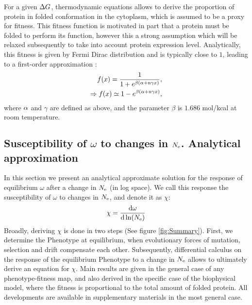 For a given $\Delta G$, thermodynamic equations allows to derive the proportion of protein in folded conformation in the cytoplasm, which is assumed to be a proxy for fitness.
This fitness function is motivated in part that a protein must be folded to perform its function, however this a strong assumption which will be relaxed subsequently to take into account protein expression level.
Analytically, this fitness is given by Fermi Dirac distribution and is typically close to $1$, leading to a first-order approximation \citep{Goldstein2011}: 
\begin{align}
 f(x) = \dfrac{1}{1 + e^{\beta (\alpha + \text{n} \gamma x)}},\\
 \Rightarrow f(x) \simeq 1 - e^{\beta (\alpha + \text{n} \gamma x)}, 
\end{align}
where $\alpha$ and $\gamma$ are defined as above, and the parameter $\beta$ is $1.686$ mol/kcal at room temperature.

\subsection{Susceptibility of \texorpdfstring{$\omega$}{ω} to changes in \texorpdfstring{$N_{\mathrm{e}}$}{Nₑ}. Analytical approximation}

In this section we present an analytical approximate solution for the response of equilibrium $\omega$ after a change in $N_{\mathrm{e}}$ (in log space). We call this response the susceptibility of $\omega$ to changes in $N_{\mathrm{e}}$, and denote it as $\chi$:
\begin{align}
 \chi = \frac{ \der \omega}{\der \ln (\Ne)} \label{eq:chi}
\end{align}
Broadly, deriving $\chi$ is done in two steps (See figure \ref{fig:Summary}).
First, we determine the \gls{Phenotype} at equilibrium, when evolutionary forces of mutation, selection and \gls{drift} compensate each other.
Subsequently, differential calculus on the response of the equilibrium \gls{Phenotype} to a change in $N_{\mathrm{e}}$ allows to ultimately derive an equation for $\chi$.
Main results are given in the general case of any phenotype-fitness map, and also derived in the specific case of the biophysical model, where the fitness is proportional to the total amount of folded protein.
All developments are available in supplementary materials in the most general case.

